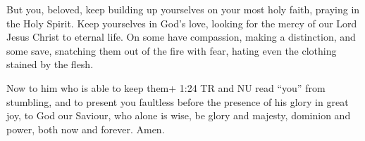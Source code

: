  But you, beloved, keep building up yourselves on your most
holy faith, praying in the Holy Spirit.  Keep yourselves in
God's love, looking for the mercy of our Lord Jesus Christ to eternal
life.  On some have compassion, making a distinction,
 and some save, snatching them out of the fire with fear,
hating even the clothing stained by the flesh.

 Now to him who is able to keep them+ 1:24 TR and NU read
``you'' from stumbling, and to present you faultless before the presence
of his glory in great joy,  to God our Saviour, who alone
is wise, be glory and majesty, dominion and power, both now and forever.
Amen.
